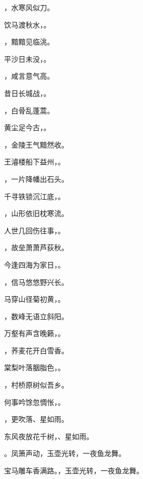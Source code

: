 \documentclass[12pt, a4paper, addpoints, answers]{exam}
\begin{document}
\begin{questions}
\question[3] ，水寒风似刀。

\question[3] 饮马渡秋水，。

\question[3] ，黯黯见临洮。

\question[3] 平沙日未没，。

\question[3] ，咸言意气高。

\question[3] 昔日长城战，。

\question[3] ，白骨乱蓬蒿。

\question[3] 黄尘足今古，。

\question[3] ，金陵王气黯然收。

\question[3] 王濬楼船下益州，。

\question[3] ，一片降幡出石头。

\question[3] 千寻铁锁沉江底，。

\question[3] ，山形依旧枕寒流。

\question[3] 人世几回伤往事，。

\question[3] ，故垒萧萧芦荻秋。

\question[3] 今逢四海为家日，。

\question[3] ，信马悠悠野兴长。

\question[3] 马穿山径菊初黄，。

\question[3] ，数峰无语立斜阳。

\question[3] 万壑有声含晚籁，。

\question[3] ，荞麦花开白雪香。

\question[3] 棠梨叶落胭脂色，。

\question[3] ，村桥原树似吾乡。

\question[3] 何事吟馀忽惆怅，。

\question[3] ，更吹落、星如雨。

\question[3] 东风夜放花千树，、星如雨。

\question[3] 。凤箫声动，玉壶光转，一夜鱼龙舞。

\question[3] 宝马雕车香满路。，玉壶光转，一夜鱼龙舞。


\end{questions}
\end{document}
